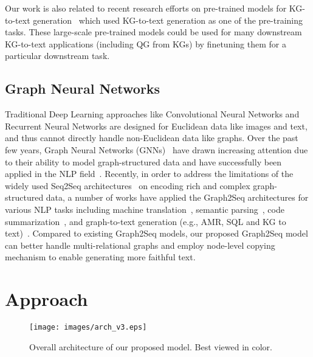 \documentclass[journal]{IEEEtran}
\begin{document}
Our work is also related to recent research efforts on pre-trained models for KG-to-text generation~\cite{chen2020kgpt,ke2021joint} which used KG-to-text generation as one of the pre-training tasks. These large-scale pre-trained models could be used for many downstream KG-to-text applications (including QG from KGs) by finetuning them for a particular downstream task.







\subsection{Graph Neural Networks}


Traditional Deep Learning approaches like Convolutional Neural Networks and Recurrent Neural Networks are designed for Euclidean data like images and text, and thus cannot directly handle non-Euclidean data like graphs. Over the past few years, Graph Neural Networks (GNNs)~\cite{kipf2016semi,gilmer2017neural,hamilton2017inductive,li2015gated,chen2020iterative,liu2022compact} have drawn increasing attention due to their ability to model graph-structured data and have successfully been applied in the NLP field~\cite{bastings2017graph,song2018graph,chen2020graphflow,wu2021graph,wu2021deep}.
Recently, in order to address the limitations of the widely used Seq2Seq architectures~\cite{sutskever2014sequence,cho2014learning} on encoding rich and complex graph-structured data, a number of works have applied the Graph2Seq architectures for various NLP tasks including machine translation~\cite{bastings2017graph,beck2018graph}, semantic parsing~\cite{xu2018exploiting}, code summarization~\cite{liu2021retrieval}, and graph-to-text generation (e.g., AMR, SQL and KG to text)~\cite{xu2018graph2seq,xu2018sql,marcheggiani2018deep,vougiouklis2018neural}.
Compared to existing Graph2Seq models, our proposed Graph2Seq model can better handle multi-relational graphs and employ node-level copying mechanism to enable generating more faithful text.




\section{Approach}

\begin{figure*}[!htb]
  \vspace{-3mm}
  \centering
\texttt{[image: images/arch\_v3.eps]}
  \caption{Overall architecture of our proposed model. Best viewed in color.}
  \label{fig:overall_arch}
\vspace{-3mm}
\end{figure*}
\end{document}
